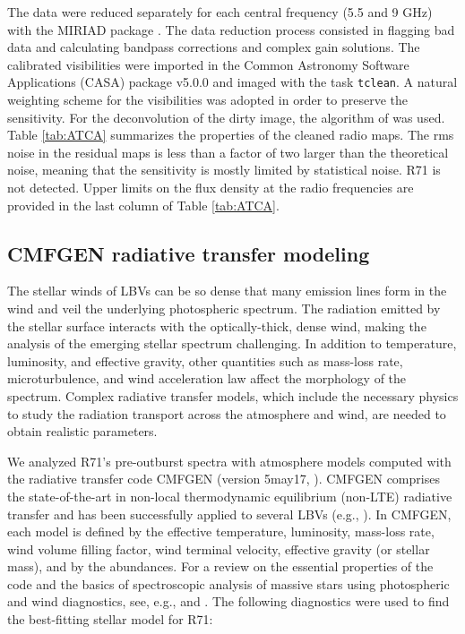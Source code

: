 \documentclass[structabstract]{aa}
\begin{document}
The data were reduced separately for each central frequency (5.5 and 9 GHz) with the MIRIAD package \citep{1995ASPC...77..433S}. The data reduction process consisted in flagging bad data and calculating bandpass corrections and complex gain solutions.
The calibrated visibilities were imported in the Common Astronomy Software Applications (CASA) package v5.0.0 \citep{2007ASPC..376..127M} and imaged with the task \texttt{tclean}. A natural weighting scheme for the visibilities was adopted in order to preserve the sensitivity. For the deconvolution of the dirty image, the algorithm of \citet{1974A&AS...15..417H} was used. Table \ref{tab:ATCA} summarizes the properties of the cleaned radio maps. The rms noise in the residual maps is less than a factor of two larger than the theoretical noise, meaning that the sensitivity is mostly limited by statistical noise. R71 is not detected. Upper limits on the flux density at the radio frequencies are provided in the last column of Table \ref{tab:ATCA}. 

\subsection{CMFGEN radiative transfer modeling}
\label{obs:CMFGEN}


The stellar winds of LBVs can be so dense that many emission lines form in the wind and veil the underlying photospheric spectrum. The radiation emitted by the stellar surface interacts with the optically-thick, dense wind, making the analysis of the emerging stellar spectrum challenging. 
In addition to temperature, luminosity, and effective gravity, other quantities such as mass-loss rate, microturbulence, and wind acceleration law affect the morphology of the spectrum. Complex radiative transfer models, which include the necessary physics to study the radiation transport across the atmosphere and wind, are needed to obtain realistic parameters.

We analyzed R71's pre-outburst spectra with atmosphere models computed with the radiative transfer code CMFGEN (version 5may17, \citealt{1998ApJ...496..407H}). CMFGEN comprises the state-of-the-art in non-local thermodynamic equilibrium (non-LTE) radiative transfer and has been successfully applied to several LBVs (e.g., \citealt{2001ApJ...553..837H,2006ApJ...638L..33G,2009ApJ...698.1698G,2011ApJ...736...46G,2009A&A...507.1555C,2012A&A...541A.146C,2011AJ....142..191G}). In CMFGEN, each model is defined by the effective temperature, luminosity, mass-loss rate, wind volume filling factor, wind terminal velocity, effective gravity (or stellar mass), and by the abundances.
For a review on the essential properties of the code and the basics of spectroscopic analysis of massive stars using photospheric and wind diagnostics, see, e.g., \citet{2011JPhCS.328a2020G} and \citet{2011BSRSL..80...29M}.
The following diagnostics were used to find the best-fitting stellar model for R71:
\end{document}
